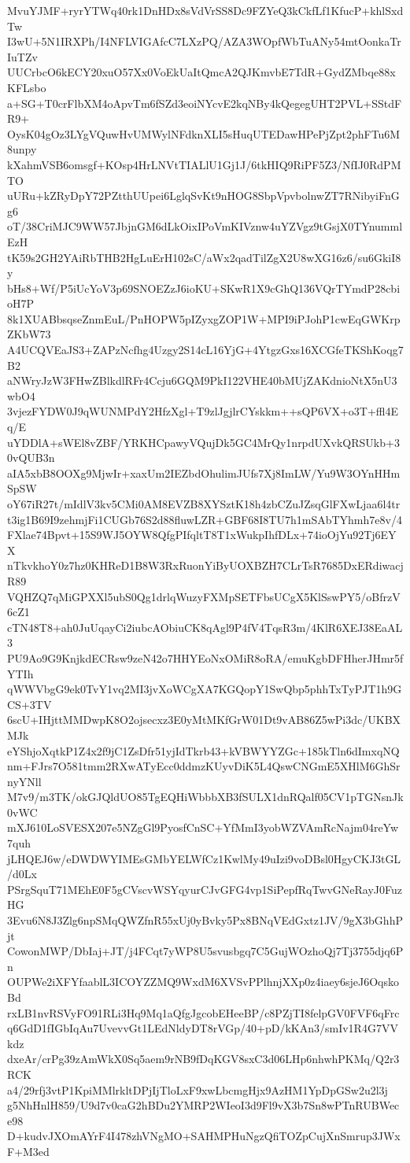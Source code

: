 MvuYJMF+ryrYTWq40rk1DnHDx8sVdVrSS8Dc9FZYeQ3kCkfLf1KfucP+khlSxdTw
I3wU+5N1IRXPh/I4NFLVIGAfcC7LXzPQ/AZA3WOpfWbTuANy54mtOonkaTrIuTZv
UUCrbcO6kECY20xuO57Xx0VoEkUaItQmcA2QJKmvbE7TdR+GydZMbqe88xKFLsbo
a+SG+T0crFlbXM4oApvTm6fSZd3eoiNYcvE2kqNBy4kQegegUHT2PVL+SStdFR9+
OysK04gOz3LYgVQuwHvUMWylNFdknXLI5sHuqUTEDawHPePjZpt2phFTu6M8unpy
kXahmVSB6omsgf+KOsp4HrLNVtTIALlU1Gj1J/6tkHIQ9RiPF5Z3/NfIJ0RdPMTO
uURu+kZRyDpY72PZtthUUpei6LglqSvKt9nHOG8SbpVpvbolnwZT7RNibyiFnGg6
oT/38CriMJC9WW57JbjnGM6dLkOixIPoVmKIVznw4uYZVgz9tGsjX0TYnummlEzH
tK59s2GH2YAiRbTHB2HgLuErH102sC/aWx2qadTilZgX2U8wXG16z6/su6GkiI8y
bHs8+Wf/P5iUcYoV3p69SNOEZzJ6ioKU+SKwR1X9cGhQ136VQrTYmdP28cbioH7P
8k1XUABbsqseZnmEuL/PnHOPW5pIZyxgZOP1W+MPI9iPJohP1cwEqGWKrpZKbW73
A4UCQVEaJS3+ZAPzNcfhg4Uzgy2S14cL16YjG+4YtgzGxs16XCGfeTKShKoqg7B2
aNWryJzW3FHwZBlkdlRFr4Ccju6GQM9PkI122VHE40bMUjZAKdnioNtX5nU3wbO4
3vjezFYDW0J9qWUNMPdY2HfzXgl+T9zlJgjlrCYskkm++sQP6VX+o3T+ffl4Eq/E
uYDDlA+sWEl8vZBF/YRKHCpawyVQujDk5GC4MrQy1nrpdUXvkQRSUkb+30vQUB3n
aIA5xbB8OOXg9MjwIr+xaxUm2IEZbdOhulimJUfs7Xj8ImLW/Yu9W3OYnHHmSpSW
oY67iR27t/mIdlV3kv5CMi0AM8EVZB8XYSztK18h4zbCZuJZsqGlFXwLjaa6l4tr
t3ig1B69I9zehmjFi1CUGb76S2d88fluwLZR+GBF68I8TU7h1mSAbTYhmh7e8v/4
FXlae74Bpvt+15S9WJ5OYW8QfgPIfqltT8T1xWukpIhfDLx+74ioOjYu92Tj6EYX
nTkvkhoY0z7hz0KHReD1B8W3RxRuonYiByUOXBZH7CLrTsR7685DxERdiwacjR89
VQHZQ7qMiGPXXl5ubS0Qg1drlqWuzyFXMpSETFbsUCgX5KlSswPY5/oBfrzV6cZ1
cTN48T8+ah0JuUqayCi2iubcAObiuCK8qAgl9P4fV4TqsR3m/4KlR6XEJ38EaAL3
PU9Ao9G9KnjkdECRsw9zeN42o7HHYEoNxOMiR8oRA/emuKgbDFHherJHmr5fYTIh
qWWVbgG9ek0TvY1vq2MI3jvXoWCgXA7KGQopY1SwQbp5phhTxTyPJT1h9GCS+3TV
6scU+IHjttMMDwpK8O2ojsecxz3E0yMtMKfGrW01Dt9vAB86Z5wPi3dc/UKBXMJk
eYShjoXqtkP1Z4x2f9jC1ZsDfr51yjIdTkrb43+kVBWYYZGc+185kTln6dImxqNQ
nm+FJrs7O581tmm2RXwATyEcc0ddmzKUyvDiK5L4QswCNGmE5XHlM6GhSrnyYNll
M7v9/m3TK/okGJQldUO85TgEQHiWbbbXB3fSULX1dnRQalf05CV1pTGNsnJk0vWC
mXJ610LoSVESX207e5NZgGl9PyosfCnSC+YfMmI3yobWZVAmRcNajm04reYw7quh
jLHQEJ6w/eDWDWYIMEsGMbYELWfCz1KwlMy49uIzi9voDBsl0HgyCKJ3tGL/d0Lx
PSrgSquT71MEhE0F5gCVscvWSYqyurCJvGFG4vp1SiPepfRqTwvGNeRayJ0FuzHG
3Evu6N8J3Zlg6npSMqQWZfnR55xUj0yBvky5Px8BNqVEdGxtz1JV/9gX3bGhhPjt
CowonMWP/DbIaj+JT/j4FCqt7yWP8U5svusbgq7C5GujWOzhoQj7Tj3755djq6Pn
OUPWe2iXFYfaablL3ICOYZZMQ9WxdM6XVSvPPlhnjXXp0z4iaey6sjeJ6OqskoBd
rxLB1nvRSVyFO91RLi3Hq9Mq1aQfgJgcobEHeeBP/c8PZjTI8felpGV0FVF6qFrc
q6GdD1fIGbIqAu7UvevvGt1LEdNldyDT8rVGp/40+pD/kKAn3/smIv1R4G7VVkdz
dxeAr/crPg39zAmWkX0Sq5aem9rNB9fDqKGV8sxC3d06LHp6nhwhPKMq/Q2r3RCK
a4/29rfj3vtP1KpiMMlrkltDPjIjTloLxF9xwLbcmgHjx9AzHM1YpDpGSw2u2l3j
g5NhHnlH859/U9d7v0caG2hBDu2YMRP2WIeoI3d9Fl9vX3b7Sn8wPTnRUBWece98
D+kudvJXOmAYrF4I478zhVNgMO+SAHMPHuNgzQfiTOZpCujXnSmrup3JWxF+M3ed
